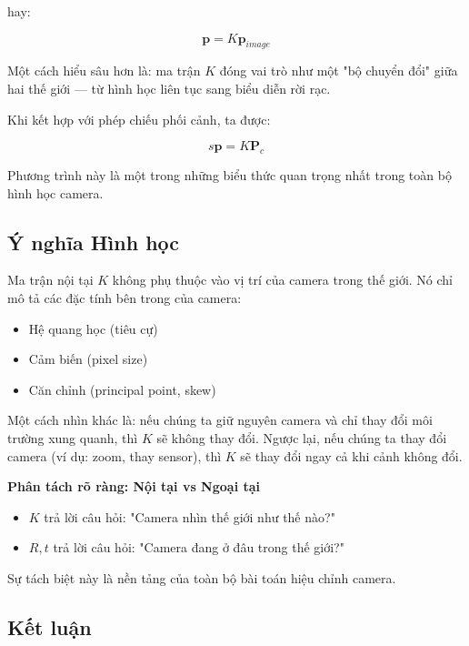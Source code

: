 hay:

\[
\mathbf{p} = K \mathbf{p}_{image}
\]

Một cách hiểu sâu hơn là: ma trận $K$ đóng vai trò như một "bộ chuyển đổi" giữa hai thế giới — từ hình học liên tục sang biểu diễn rời rạc.

Khi kết hợp với phép chiếu phối cảnh, ta được:

\[
s \mathbf{p} = K \mathbf{P}_c
\]

Phương trình này là một trong những biểu thức quan trọng nhất trong toàn bộ hình học camera.

\subsection{Ý nghĩa Hình học}
\label{subsec:intrinsic_geometry}

Ma trận nội tại $K$ không phụ thuộc vào vị trí của camera trong thế giới. Nó chỉ mô tả các đặc tính bên trong của camera:

\begin{itemize}
	\item Hệ quang học (tiêu cự)
	\item Cảm biến (pixel size)
	\item Căn chỉnh (principal point, skew)
\end{itemize}

Một cách nhìn khác là: nếu chúng ta giữ nguyên camera và chỉ thay đổi môi trường xung quanh, thì $K$ sẽ không thay đổi. Ngược lại, nếu chúng ta thay đổi camera (ví dụ: zoom, thay sensor), thì $K$ sẽ thay đổi ngay cả khi cảnh không đổi.

\begin{mdframed}[style=infobox]
	\textbf{Phân tách rõ ràng: Nội tại vs Ngoại tại}
	
	\begin{itemize}
		\item $K$ trả lời câu hỏi: "Camera nhìn thế giới như thế nào?"
		\item $R, t$ trả lời câu hỏi: "Camera đang ở đâu trong thế giới?"
	\end{itemize}
	
	Sự tách biệt này là nền tảng của toàn bộ bài toán hiệu chỉnh camera.
\end{mdframed}

\subsection*{Kết luận}
\label{subsec:intrinsic_conclusion}

